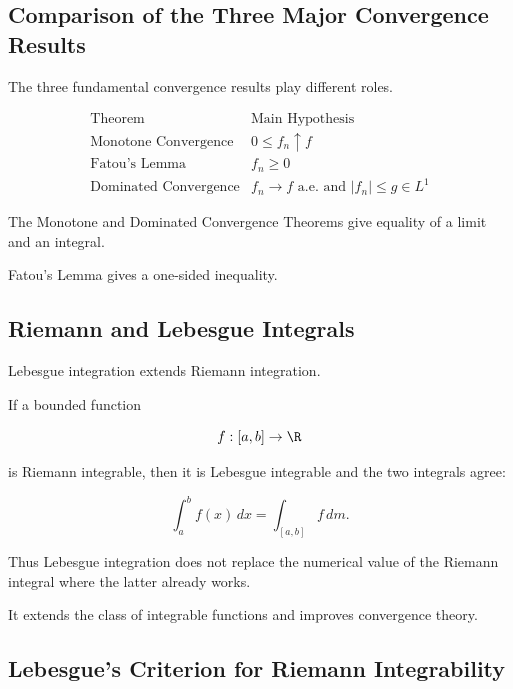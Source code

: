 \subsection{Comparison of the Three Major Convergence Results}
\label{subsec:comparison-convergence-theorems}

The three fundamental convergence results play different roles.

\[
\boxed{
\begin{array}{c|c}
\text{Theorem} & \text{Main Hypothesis}\\
\hline
\text{Monotone Convergence} &
0\leq f_n\uparrow f\\
\text{Fatou's Lemma} &
f_n\geq0\\
\text{Dominated Convergence} &
f_n\to f\text{ a.e. and }|f_n|\leq g\in L^1
\end{array}
}
\]

The Monotone and Dominated Convergence Theorems give equality of a limit
and an integral.

Fatou's Lemma gives a one-sided inequality.

\subsection{Riemann and Lebesgue Integrals}
\label{subsec:riemann-lebesgue-comparison}

Lebesgue integration extends Riemann integration.

\begin{theorem}
If a bounded function

\[
f:[a,b]\to\R
\]

is Riemann integrable, then it is Lebesgue integrable and the two integrals
agree:

\[
\boxed{
\int_a^b f(x)\,dx
=
\int_{[a,b]}f\,dm.
}
\]
\end{theorem}

Thus Lebesgue integration does not replace the numerical value of the
Riemann integral where the latter already works.

It extends the class of integrable functions and improves convergence
theory.

\subsection{Lebesgue's Criterion for Riemann Integrability}
\label{subsec:lebesgue-criterion-riemann}

